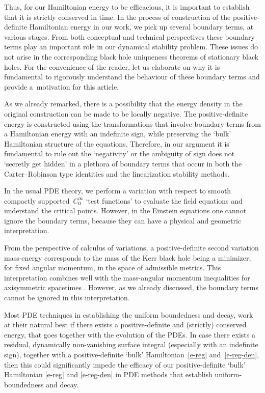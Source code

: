 \documentclass[11pt]{article}
\numberwithin{equation}{section}
\numberwithin{equation}{section}
\begin{document}
Thus, for our Hamiltonian energy to be efficacious, it is important to establish that it is strictly conserved in time. In the process of construction of the positive-definite Hamiltonian energy in our work, we pick up several boundary terms, at various stages. From both conceptual and technical perspectives these boundary terms play an important role in our dynamical stability problem. These issues do not arise in the corresponding black hole uniqueness theorems of stationary black holes. For the convenience of the reader, let us elaborate on why it is fundamental to rigorously understand the behaviour of these boundary terms and provide a~motivation for this article.

 As we already remarked, there is a possibility that the energy density in the original construction can be made to be locally negative. The positive-definite energy is constructed using the transformations that involve boundary terms from a Hamiltonian energy with an indefinite sign, while preserving the `bulk' Hamiltonian structure of the equations. Therefore, in our argument it is fundamental to rule out the `negativity' or the ambiguity of sign does not `secretly get hidden' in a plethora of boundary terms that occur in both the Carter--Robinson type identities and the linearization stability methods.

 In the usual PDE theory, we perform a variation with respect to smooth compactly supported~$C^\infty_0$ `test functions' to evaluate the field equations and understand the critical points. However, in the Einstein equations one cannot ignore the boundary terms, because they can have a physical and geometric interpretation.

 From the perspective of calculus of variations, a positive-definite second variation mass-energy corresponds to the mass of the Kerr black hole being a minimizer, for fixed angular momentum, in the space of admissible metrics. This interpretation combines well with the mass-angular momentum inequalities for axisymmetric spacetimes \cite{D09}. However, as we already discussed, the boundary terms cannot be ignored in this interpretation.

 Most PDE techniques in establishing the uniform boundedness and decay, work at their natural best if there exists a positive-definite and (strictly) conserved energy, that goes together with the evolution of the PDEs. In case there exists a residual, dynamically non-vanishing surface integral (especially with an indefinite sign), together with a positive-definite `bulk' Hamiltonian~\eqref{e-reg} and~\eqref{e-reg-den}, then this could significantly impede the efficacy of our positive-definite `bulk' Hamiltonian \eqref{e-reg} and \eqref{e-reg-den} in PDE methods that establish uniform-boundedness and decay.
\end{document}
